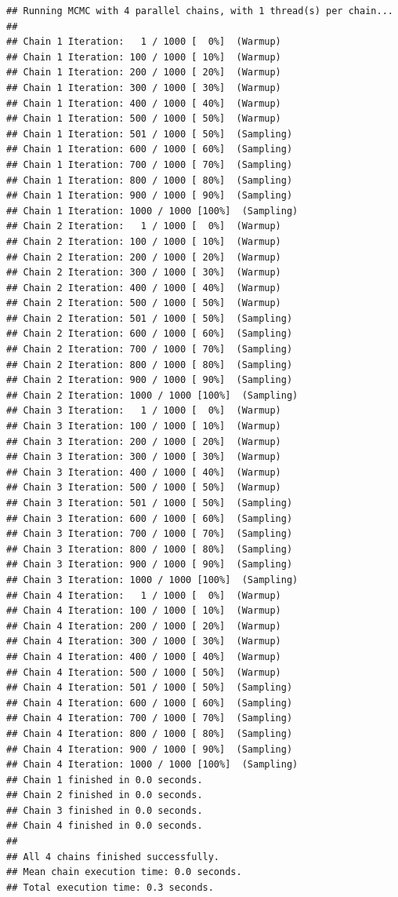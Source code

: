 \documentclass[
]{book}
\begin{document}
\begin{verbatim}
## Running MCMC with 4 parallel chains, with 1 thread(s) per chain...
## 
## Chain 1 Iteration:   1 / 1000 [  0%]  (Warmup) 
## Chain 1 Iteration: 100 / 1000 [ 10%]  (Warmup) 
## Chain 1 Iteration: 200 / 1000 [ 20%]  (Warmup) 
## Chain 1 Iteration: 300 / 1000 [ 30%]  (Warmup) 
## Chain 1 Iteration: 400 / 1000 [ 40%]  (Warmup) 
## Chain 1 Iteration: 500 / 1000 [ 50%]  (Warmup) 
## Chain 1 Iteration: 501 / 1000 [ 50%]  (Sampling) 
## Chain 1 Iteration: 600 / 1000 [ 60%]  (Sampling) 
## Chain 1 Iteration: 700 / 1000 [ 70%]  (Sampling) 
## Chain 1 Iteration: 800 / 1000 [ 80%]  (Sampling) 
## Chain 1 Iteration: 900 / 1000 [ 90%]  (Sampling) 
## Chain 1 Iteration: 1000 / 1000 [100%]  (Sampling) 
## Chain 2 Iteration:   1 / 1000 [  0%]  (Warmup) 
## Chain 2 Iteration: 100 / 1000 [ 10%]  (Warmup) 
## Chain 2 Iteration: 200 / 1000 [ 20%]  (Warmup) 
## Chain 2 Iteration: 300 / 1000 [ 30%]  (Warmup) 
## Chain 2 Iteration: 400 / 1000 [ 40%]  (Warmup) 
## Chain 2 Iteration: 500 / 1000 [ 50%]  (Warmup) 
## Chain 2 Iteration: 501 / 1000 [ 50%]  (Sampling) 
## Chain 2 Iteration: 600 / 1000 [ 60%]  (Sampling) 
## Chain 2 Iteration: 700 / 1000 [ 70%]  (Sampling) 
## Chain 2 Iteration: 800 / 1000 [ 80%]  (Sampling) 
## Chain 2 Iteration: 900 / 1000 [ 90%]  (Sampling) 
## Chain 2 Iteration: 1000 / 1000 [100%]  (Sampling) 
## Chain 3 Iteration:   1 / 1000 [  0%]  (Warmup) 
## Chain 3 Iteration: 100 / 1000 [ 10%]  (Warmup) 
## Chain 3 Iteration: 200 / 1000 [ 20%]  (Warmup) 
## Chain 3 Iteration: 300 / 1000 [ 30%]  (Warmup) 
## Chain 3 Iteration: 400 / 1000 [ 40%]  (Warmup) 
## Chain 3 Iteration: 500 / 1000 [ 50%]  (Warmup) 
## Chain 3 Iteration: 501 / 1000 [ 50%]  (Sampling) 
## Chain 3 Iteration: 600 / 1000 [ 60%]  (Sampling) 
## Chain 3 Iteration: 700 / 1000 [ 70%]  (Sampling) 
## Chain 3 Iteration: 800 / 1000 [ 80%]  (Sampling) 
## Chain 3 Iteration: 900 / 1000 [ 90%]  (Sampling) 
## Chain 3 Iteration: 1000 / 1000 [100%]  (Sampling) 
## Chain 4 Iteration:   1 / 1000 [  0%]  (Warmup) 
## Chain 4 Iteration: 100 / 1000 [ 10%]  (Warmup) 
## Chain 4 Iteration: 200 / 1000 [ 20%]  (Warmup) 
## Chain 4 Iteration: 300 / 1000 [ 30%]  (Warmup) 
## Chain 4 Iteration: 400 / 1000 [ 40%]  (Warmup) 
## Chain 4 Iteration: 500 / 1000 [ 50%]  (Warmup) 
## Chain 4 Iteration: 501 / 1000 [ 50%]  (Sampling) 
## Chain 4 Iteration: 600 / 1000 [ 60%]  (Sampling) 
## Chain 4 Iteration: 700 / 1000 [ 70%]  (Sampling) 
## Chain 4 Iteration: 800 / 1000 [ 80%]  (Sampling) 
## Chain 4 Iteration: 900 / 1000 [ 90%]  (Sampling) 
## Chain 4 Iteration: 1000 / 1000 [100%]  (Sampling) 
## Chain 1 finished in 0.0 seconds.
## Chain 2 finished in 0.0 seconds.
## Chain 3 finished in 0.0 seconds.
## Chain 4 finished in 0.0 seconds.
## 
## All 4 chains finished successfully.
## Mean chain execution time: 0.0 seconds.
## Total execution time: 0.3 seconds.
\end{verbatim}
\end{document}
